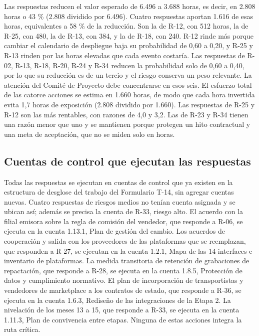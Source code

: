 \documentclass[11pt]{article}
\begin{document}
Las respuestas reducen el valor esperado de 6.496 a 3.688 horas, es decir, en 2.808 horas o 43 \% (2.808 dividido por 6.496). Cuatro respuestas aportan 1.616 de esas horas, equivalentes a 58 \% de la reducción. Son la de R-12, con 512 horas, la de R-25, con 480, la de R-13, con 384, y la de R-18, con 240. R-12 rinde más porque cambiar el calendario de despliegue baja su probabilidad de 0,60 a 0,20, y R-25 y R-13 rinden por las horas elevadas que cada evento costaría. Las respuestas de R-02, R-13, R-18, R-20, R-24 y R-34 reducen la probabilidad solo de 0,60 a 0,40, por lo que su reducción es de un tercio y el riesgo conserva un peso relevante. La atención del Comité de Proyecto debe concentrarse en esos seis. El esfuerzo total de las catorce acciones se estima en 1.660 horas, de modo que cada hora invertida evita 1,7 horas de exposición (2.808 dividido por 1.660). Las respuestas de R-25 y R-12 son las más rentables, con razones de 4,0 y 3,2. Las de R-23 y R-34 tienen una razón menor que uno y se mantienen porque protegen un hito contractual y una meta de aceptación, que no se miden solo en horas.

\subsection{Cuentas de control que ejecutan las respuestas}

Todas las respuestas se ejecutan en cuentas de control que ya existen en la estructura de desglose del trabajo del Formulario T-14, sin agregar cuentas nuevas. Cuatro respuestas de riesgos medios no tenían cuenta asignada y se ubican así; además se precisa la cuenta de R-33, riesgo alto. El acuerdo con la filial emisora sobre la regla de comisión del vendedor, que responde a R-06, se ejecuta en la cuenta 1.13.1, Plan de gestión del cambio. Los acuerdos de cooperación y salida con los proveedores de las plataformas que se reemplazan, que responden a R-27, se ejecutan en la cuenta 1.2.1, Mapa de las 14 interfaces e inventario de plataformas. La medida transitoria de retención de grabaciones de repactación, que responde a R-28, se ejecuta en la cuenta 1.8.5, Protección de datos y cumplimiento normativo. El plan de incorporación de transportistas y vendedores de marketplace a los contratos de estado, que responde a R-36, se ejecuta en la cuenta 1.6.3, Rediseño de las integraciones de la Etapa 2. La nivelación de los meses 13 a 15, que responde a R-33, se ejecuta en la cuenta 1.11.3, Plan de convivencia entre etapas. Ninguna de estas acciones integra la ruta crítica.
\end{document}
